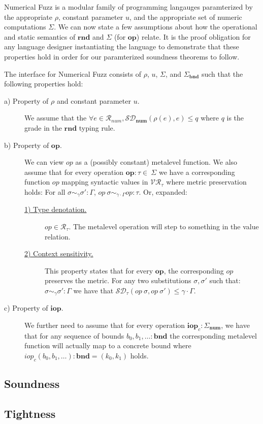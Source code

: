Numerical Fuzz is a modular family of programming langauges paramterized by the
appropriate $\rho$, constant parameter $u$, and the appropriate set of numeric
computations $\Sigma$.  
We can now state a few assumptions about how the operational and static
semantics of $\mathbf{rnd}$ and $\Sigma$ (for $\mathbf{op}$) relate.
It is the proof obligation for any language designer instantiating the language
to demonstrate that these properties hold in order for our paramterized
soundness theorems to follow.
\begin{definition}
  \label{def:numfuzz-interface}
  The interface for Numerical Fuzz consists of $\rho$, $u$, $\Sigma$, and
  $\Sigma_{\mathbf{bnd}}$ such that the following properties hold: 
\begin{description}
  \item[a) Property of $\rho$ and constant parameter $u$.] We assume that the
    $\forall e \in \mathcal{R}_{num}, \mathcal{SD}_{\mathbf{num}}(\rho(e), e)
    \leq q$ where $q$ is the grade in the $\mathbf{rnd}$ typing rule.
  \item[b) Property of $\mathbf{op}$.] 
    We can view $\textit{op}$ as a (possibly constant) metalevel function.
    We also assume that for every operation
    $\mathbf{op} : \tau \in \ \Sigma$ we have a
    corresponding function $op$ mapping syntactic values in
    $\mathcal{VR}_{\tau}$ where metric preservation holds: For all $\sigma
    \sim_{\gamma} \sigma' : \Gamma$, $\textit{op}~\sigma \sim_{\gamma \cdot
    \Gamma} \textit{op} : \tau$.
    Or, expanded:
    \begin{description}
      \item[\underline{1) Type denotation.}] $\mathit{op} \in
        \mathcal{R}_{\tau}$. The metalevel operation will step to something in the
        value relation.
      \item[\underline{2) Context sensitivity.}]
        This property states that for every $\textbf{op}$, the
        corresponding $\textit{op}$ preserves the metric. For any two
        substitutions $\sigma, \sigma'$ such that:
        $\sigma \sim_{\gamma} \sigma' : \Gamma$
        we have that
        $\mathcal{SD}_{\tau}(\textit{op}~\sigma, \textit{op}~\sigma') \leq \gamma \cdot \Gamma$.
    \end{description} \item[c) Property of $\mathbf{iop}$.] We further need to
      assume that for every operation $\mathbf{iop}_c : \Sigma_\textbf{num}$, we
      have that for any sequence of bounds $b_0, b_1, \ldots : \textbf{bnd}$ the
      corresponding metalevel function will actually map to a concrete bound
      where $\textit{iop}_c(b_0, b_1, \ldots) : \textbf{bnd} = (k_0, k_1)$
      holds.
\end{description}
\end{definition}

\subsection{Soundness}


\subsection{Tightness} \label{sec:tightness}



